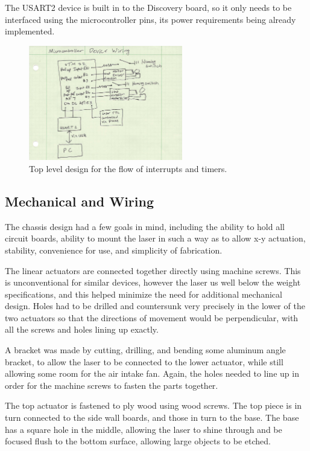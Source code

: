 \documentclass[11pt]{LaTeX-Classes/math-hw}
\begin{document}
The USART2 device is built in to the Discovery board, so it only needs to be interfaced using the
microcontroller pins, its power requirements being already implemented.

\begin{figure}[H]
	   \begin{center}
	     \includegraphics[width=0.6\textwidth]{mcwiringdiagram}
	     \caption{Top level design for the flow of interrupts and timers.}
	     \label{fig:mcwiringdiagram}
	   \end{center}
	 \end{figure}

\subsection{Mechanical and Wiring}

The chassis design had a few goals in mind, including the ability to hold all circuit boards,
ability to mount the laser in such a way as to allow x-y actuation,
stability, convenience for use, and simplicity of fabrication.

The linear actuators are connected together directly using machine screws. This is unconventional
for similar devices, however the laser us well below the weight specifications, and this helped
minimize the need for additional mechanical design. Holes had to be drilled and countersunk very
precisely in the lower of the two actuators so that the directions of movement would be perpendicular,
with all the screws and holes lining up exactly.

A bracket was made by cutting, drilling, and bending some aluminum angle bracket, to allow the
laser to be connected to the lower actuator, while still allowing some room for the air intake fan.
Again, the holes needed to line up in order for the machine screws to fasten the parts together.

The top actuator is fastened to ply wood using wood screws. The top piece is in turn connected
to the side wall boards, and those in turn to the base.
The base has a square hole in the middle, allowing the laser to shine through and be focused
flush to the bottom surface, allowing large objects to be etched.
\end{document}
